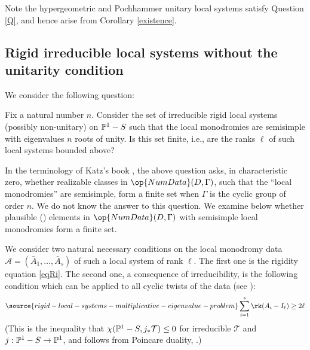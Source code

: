 Note the hypergeometric and Pochhammer unitary local systems satisfy Question
\ref{Q}, and hence arise from Corollary \ref{existence}.

\subsection{Rigid irreducible local systems without the unitarity condition}\label{afterN}
We consider the following question:
\begin{question}
\notready Fix a natural number $n$. Consider the set of  irreducible rigid local systems (possibly non-unitary) on $\Bbb{P}^1-S$  such that the local  monodromies are semisimple with eigenvalues $n$ roots of unity.
Is this set finite, i.e., are the ranks $\ell$ of such local systems bounded above?
\end{question}
In the terminology of Katz's book \cite[Section 6.1]{Katz},  the above question asks, in characteristic zero,  whether  realizable  classes in $\op{NumData}(D,\Gamma)$, such that the ``local monodromies'' are semisimple, form a finite set when $\Gamma$ is the cyclic group of order $n$. We do not know the answer to this question.  We examine  below whether plausible (\cite[Definition  6.3.3]{Katz}) elements  in $\op{NumData}(D,\Gamma)$ with semisimple local monodromies form a finite set.


We consider
two natural  necessary conditions on the local monodromy data $\mathcal{A}=(\bar{A}_1,\dots,\bar{A}_s)$ of such a local system of rank $\ell$. The first one is the rigidity equation  \eqref{eqRi}. The second one, a consequence of irreducibility, is the following condition  which can be applied to all cyclic twists of the data (see \cite[Lemma III.9.10]{MM}):
\begin{equation}\label{irreducible1}
\source{rigid-local-systems-multiplicative-eigenvalue-problem}
\sum_{i=1}^s \rk(A_i-I_{\ell})\geq 2\ell
\end{equation}
(This is the inequality that $\chi(\Bbb{P}^1-S, j_*\mathcal{T})\leq 0$ for irreducible $\mathcal{T}$ and $j:\Bbb{P}^1-S\to \Bbb{P}^1$, and follows from Poincare duality, \cite[Section 1.1]{Katz}.)

